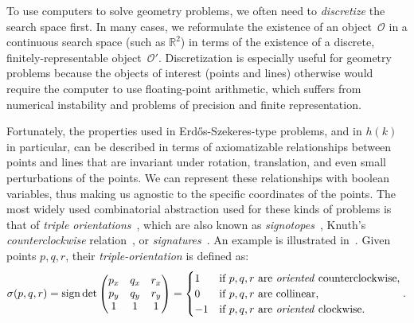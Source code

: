 To use computers to solve geometry problems,
we often need to \emph{discretize} the search space first.
In many cases,
we reformulate the existence of an object~$\mathcal{O}$ in a continuous search space (such as $\mathbb{R}^2$)
in terms of the existence of a discrete, finitely-representable object~$\mathcal{O}'$.
Discretization is especially useful for geometry problems because the objects of interest (points and lines) otherwise would require the computer to use floating-point arithmetic,
which suffers from numerical instability and problems of precision and finite representation.

Fortunately,
the properties used in Erd\H{o}s-Szekeres-type problems,
and in $h(k)$ in particular,
can be described in terms of axiomatizable relationships between points and lines
that are invariant under rotation, translation, and even small perturbations of the points.
We can represent these relationships with boolean variables,
thus making us agnostic to the specific coordinates of the points.
The most widely used combinatorial abstraction used for these kinds of problems is that of \emph{triple orientations}~\cite{ emptyHexagonNumber, scheucherTwoDisjoint5holes2020},
which are also known as \emph{signotopes}~\cite{felsnerSweepsArrangementsSignotopes2001,subercaseaux2023minimizing},
Knuth's \emph{counterclockwise} relation~\cite{knuthAxiomsHulls1992},
or \emph{signatures}~\cite{szekeres_peters_2006}.
An example is illustrated in~.
Given points $p, q, r$, their \emph{triple-orientation} is defined as:
\newcommand{\sign}{\operatorname{sign}}
\[
  \sigma(p, q, r) = \sign \det \begin{pmatrix} p_x & q_x & r_x \\ p_y & q_y & r_y \\ 1 & 1 & 1 \end{pmatrix} = \begin{cases}
    1 & \text{if } p, q, r \text{ are \emph{oriented} counterclockwise}, \\
    0 & \text{if } p, q, r \text{ are collinear}, \\
    -1 & \text{if } p, q, r \text{ are \emph{oriented} clockwise}.
  \end{cases}.
\]

